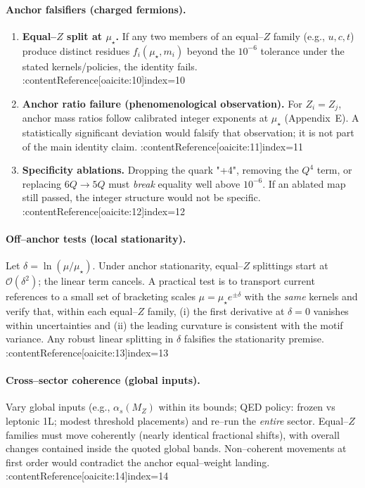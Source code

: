 \documentclass[epjc3]{svjour3}
\begin{document}
\paragraph{Anchor falsifiers (charged fermions).}
\begin{enumerate}
  \item \textbf{Equal–$Z$ split at $\mu_\star$.} If any two members of an equal–$Z$ family (e.g., $u,c,t$) produce distinct residues $f_i(\mu_\star,m_i)$ beyond the $10^{-6}$ tolerance under the stated kernels/policies, the identity fails. :contentReference[oaicite:10]{index=10}
  \item \textbf{Anchor ratio failure (phenomenological observation).} For $Z_i=Z_j$, anchor mass ratios follow calibrated integer exponents at $\mu_\star$ (Appendix~E). A statistically significant deviation would falsify that observation; it is not part of the main identity claim. :contentReference[oaicite:11]{index=11}
  \item \textbf{Specificity ablations.} Dropping the quark "+4", removing the $Q^4$ term, or replacing $6Q\!\to\!5Q$ must \emph{break} equality well above $10^{-6}$. If an ablated map still passed, the integer structure would not be specific. :contentReference[oaicite:12]{index=12}
\end{enumerate}

\paragraph{Off–anchor tests (local stationarity).}
Let $\delta=\ln(\mu/\mu_\star)$. Under anchor stationarity, equal–$Z$ splittings start at $\mathcal O(\delta^2)$; the linear term cancels. A practical test is to transport current references to a small set of bracketing scales $\mu=\mu_\star e^{\pm\delta}$ with the \emph{same} kernels and verify that, within each equal–$Z$ family, (i) the first derivative at $\delta=0$ vanishes within uncertainties and (ii) the leading curvature is consistent with the motif variance. Any robust linear splitting in $\delta$ falsifies the stationarity premise. :contentReference[oaicite:13]{index=13}

\paragraph{Cross–sector coherence (global inputs).}
Vary global inputs (e.g., $\alpha_s(M_Z)$ within its bounds; QED policy: frozen vs leptonic 1L; modest threshold placements) and re–run the \emph{entire} sector. Equal–$Z$ families must move coherently (nearly identical fractional shifts), with overall changes contained inside the quoted global bands. Non–coherent movements at first order would contradict the anchor equal–weight landing. :contentReference[oaicite:14]{index=14}
\end{document}
